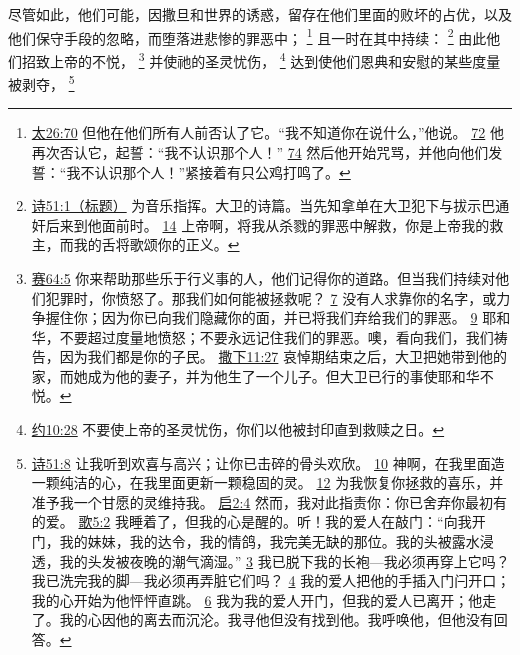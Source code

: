 \documentclass[12pt, a4paper, oneside]{ctexart}
\newcounter{parnum}[section]
\newcommand{\N}{%
   \noindent\refstepcounter{parnum}%
    \makebox[\parindent][l]{\textbf{\arabic{parnum}.}}}
\begin{document}
\N 尽管如此，他们可能，因撒旦和世界的诱惑，留存在他们里面的败坏的占优，以及他们保守手段的忽略，而堕落进悲惨的罪恶中；
	\footnote {
		\href{https://biblehub.com/matthew/26-70.htm}{太26:70} 但他在他们所有人前否认了它。“我不知道你在说什么，”他说。
		\href{https://biblehub.com/matthew/26-72.htm}{72} 他再次否认它，起誓：“我不认识那个人！”
		\href{https://biblehub.com/matthew/26-74.htm}{74} 然后他开始咒骂，并他向他们发誓：“我不认识那个人！”紧接着有只公鸡打鸣了。
	}
	且一时在其中持续：
	\footnote {
		\href{https://biblehub.com/psalms/51-1.htm}{诗51:1（标题）} 为音乐指挥。大卫的诗篇。当先知拿单在大卫犯下与拔示巴通奸后来到他面前时。
		\href{https://biblehub.com/psalms/51-14.htm}{14} 上帝啊，将我从杀戮的罪恶中解救，你是上帝我的救主，而我的舌将歌颂你的正义。
	}
	由此他们招致上帝的不悦，
	\footnote {
		\href{https://biblehub.com/isaiah/64-5.htm}{赛64:5} 你来帮助那些乐于行义事的人，他们记得你的道路。但当我们持续对他们犯罪时，你愤怒了。那我们如何能被拯救呢？
		\href{https://biblehub.com/isaiah/64-7.htm}{7} 没有人求靠你的名字，或力争握住你；因为你已向我们隐藏你的面，并已将我们弃给我们的罪恶。
		\href{https://biblehub.com/isaiah/64-9.htm}{9} 耶和华，不要超过度量地愤怒；不要永远记住我们的罪恶。噢，看向我们，我们祷告，因为我们都是你的子民。
		\href{https://biblehub.com/2_samuel/11-27.htm}{撒下11:27} 哀悼期结束之后，大卫把她带到他的家，而她成为他的妻子，并为他生了一个儿子。但大卫已行的事使耶和华不悦。
	}
	并使祂的圣灵忧伤，
	\footnote {
		\href{https://biblehub.com/ephesians/4-30.htm}{约10:28} 不要使上帝的圣灵忧伤，你们以他被封印直到救赎之日。
	}
	达到使他们恩典和安慰的某些度量被剥夺，
	\footnote {
		\href{https://biblehub.com/psalms/51-8.htm}{诗51:8} 让我听到欢喜与高兴；让你已击碎的骨头欢欣。
		\href{https://biblehub.com/psalms/51-10.htm}{10} 神啊，在我里面造一颗纯洁的心，在我里面更新一颗稳固的灵。
		\href{https://biblehub.com/psalms/51-12.htm}{12} 为我恢复你拯救的喜乐，并准予我一个甘愿的灵维持我。
		\href{https://biblehub.com/revelation/2-4.htm}{启2:4} 然而，我对此指责你：你已舍弃你最初有的爱。
		\href{https://biblehub.com/songs/5-2.htm}{歌5:2} 我睡着了，但我的心是醒的。听！我的爱人在敲门：“向我开门，我的妹妹，我的达令，我的情鸽，我完美无缺的那位。我的头被露水浸透，我的头发被夜晚的潮气滴湿。”
		\href{https://biblehub.com/songs/5-3.htm}{3} 我已脱下我的长袍---我必须再穿上它吗？我已洗完我的脚---我必须再弄脏它们吗？
		\href{https://biblehub.com/songs/5-4.htm}{4} 我的爱人把他的手插入门闩开口；我的心开始为他怦怦直跳。
		\href{https://biblehub.com/songs/5-6.htm}{6} 我为我的爱人开门，但我的爱人已离开；他走了。我的心因他的离去而沉沦。我寻他但没有找到他。我呼唤他，但他没有回答。
	}
\end{document}
